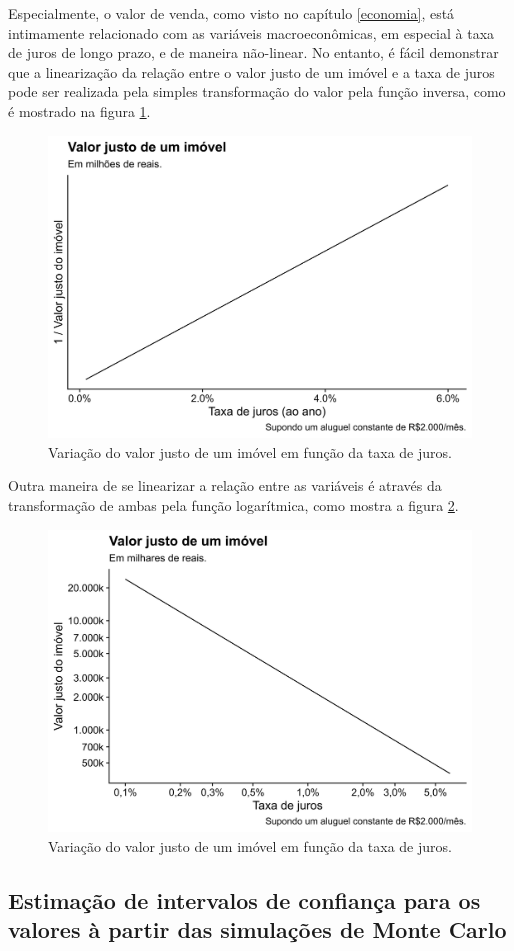 \documentclass[
	12pt,				%
	oneside,			%
	a4paper,			%
	chapter=TITLE,		%
	section=TITLE,		%
	english,			%
	brazil				%
	]{abntex2}
\begin{document}
Especialmente, o valor de venda, como visto no capítulo \ref{economia}, está
intimamente relacionado com as variáveis macroeconômicas, em especial à taxa de
juros de longo prazo, e de maneira não-linear. No entanto, é fácil demonstrar
que a linearização da relação entre o valor justo de um imóvel e a taxa de juros
pode ser realizada pela simples transformação do valor pela função inversa,
como é mostrado na figura \ref{fig:valores-juros-rec}.
\begin{figure}[H]

{\centering \includegraphics[width=0.7\linewidth]{images/valores-juros-rec-1} 

}

\caption{Variação do valor justo de um imóvel em função da taxa de juros.}\label{fig:valores-juros-rec}
\end{figure}
Outra maneira de se linearizar a relação entre as variáveis é através da
transformação de ambas pela função logarítmica, como mostra a figura
\ref{fig:valores-juros-log}.
\begin{figure}[H]

{\centering \includegraphics[width=0.7\linewidth]{images/valores-juros-log-1} 

}

\caption{Variação do valor justo de um imóvel em função da taxa de juros.}\label{fig:valores-juros-log}
\end{figure}
\hypertarget{estimauxe7uxe3o-de-intervalos-de-confianuxe7a-para-os-valores-uxe0-partir-das-simulauxe7uxf5es-de-monte-carlo}{%
\subsection{Estimação de intervalos de confiança para os valores à partir das simulações de Monte Carlo}\label{estimauxe7uxe3o-de-intervalos-de-confianuxe7a-para-os-valores-uxe0-partir-das-simulauxe7uxf5es-de-monte-carlo}}
\end{document}
